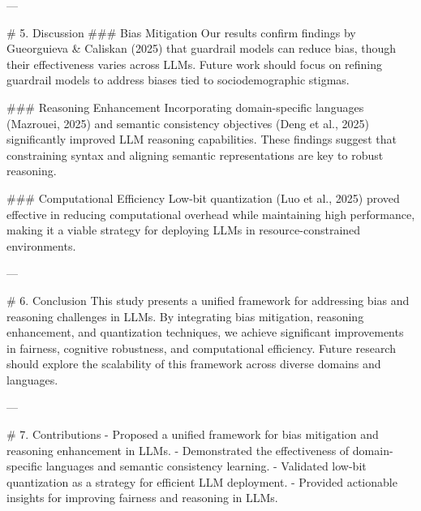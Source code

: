---

# 5. Discussion
### Bias Mitigation
Our results confirm findings by Gueorguieva & Caliskan (2025) that guardrail models can reduce bias, though their effectiveness varies across LLMs. Future work should focus on refining guardrail models to address biases tied to sociodemographic stigmas.

### Reasoning Enhancement
Incorporating domain-specific languages (Mazrouei, 2025) and semantic consistency objectives (Deng et al., 2025) significantly improved LLM reasoning capabilities. These findings suggest that constraining syntax and aligning semantic representations are key to robust reasoning.

### Computational Efficiency
Low-bit quantization (Luo et al., 2025) proved effective in reducing computational overhead while maintaining high performance, making it a viable strategy for deploying LLMs in resource-constrained environments.

---

# 6. Conclusion
This study presents a unified framework for addressing bias and reasoning challenges in LLMs. By integrating bias mitigation, reasoning enhancement, and quantization techniques, we achieve significant improvements in fairness, cognitive robustness, and computational efficiency. Future research should explore the scalability of this framework across diverse domains and languages.

---

# 7. Contributions
- Proposed a unified framework for bias mitigation and reasoning enhancement in LLMs.
- Demonstrated the effectiveness of domain-specific languages and semantic consistency learning.
- Validated low-bit quantization as a strategy for efficient LLM deployment.
- Provided actionable insights for improving fairness and reasoning in LLMs.

